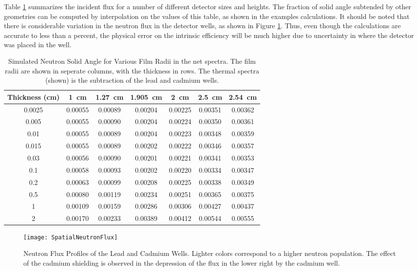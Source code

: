 Table \ref{tab:NeutronSolidAngle} summarizes the incident flux for a number of different detector sizes and heights.
The fraction of solid angle subtended by other geometries can be computed by interpolation on the values of this table, as shown in the examples calculations.
It should be noted that there is considerable variation in the neutron flux in the detector wells, as shown in Figure \ref{fig:NeutronFluxProfiles}.
Thus, even though the calculations are accurate to less than a percent, the physical error on the intrinsic efficiency will be much higher due to uncertainty in where the detector was placed in the well.

\begin{table}
	\centering
	\caption[Simulated Thermal Neutron Solid Angle for Various Film Radii]{Simulated Neutron Solid Angle for Various Film Radii in the net spectra. The film radii are shown in seperate columns, with the thickness in rows. The thermal spectra (shown) is the subtraction of the lead and cadmium wells.}
	\label{tab:NeutronSolidAngle}
	\begin{tabular}{c | c c c c c c}
Thickness (\si{\cm})	&	\SI{1}{\cm}	&	\SI{1.27}{\cm}	&	\SI{1.905}{\cm}	&	\SI{2}{\cm}	&	\SI{2.5}{\cm}	&	\SI{2.54}{\cm} \\ \hline
0.0025	&	0.00055	&	0.00089	&	0.00204	&	0.00225	&	0.00351	&	0.00362	\\
0.005	&	0.00055	&	0.00090	&	0.00204	&	0.00224	&	0.00350	&	0.00361	\\
0.01	&	0.00055	&	0.00089	&	0.00204	&	0.00223	&	0.00348	&	0.00359	\\
0.015	&	0.00055	&	0.00089	&	0.00202	&	0.00222	&	0.00346	&	0.00357	\\
0.03	&	0.00056	&	0.00090	&	0.00201	&	0.00221	&	0.00341	&	0.00353	\\
0.1	&	0.00058	&	0.00093	&	0.00202	&	0.00220	&	0.00334	&	0.00347	\\
0.2	&	0.00063	&	0.00099	&	0.00208	&	0.00225	&	0.00338	&	0.00349	\\
0.5	&	0.00080	&	0.00119	&	0.00234	&	0.00251	&	0.00365	&	0.00375	\\
1	&	0.00109	&	0.00159	&	0.00286	&	0.00306	&	0.00427	&	0.00437	\\
2	&	0.00170	&	0.00233	&	0.00389	&	0.00412	&	0.00544	&	0.00555	\\
	\end{tabular}
\end{table}
\begin{figure}
	\texttt{[image: SpatialNeutronFlux]}
  \caption[Neutron Flux Profiles of the Lead and Cadmium Wells]{Neutron Flux Profiles of the Lead and Cadmium Wells. Lighter colors correspond to a higher neutron population. The effect of the cadmium shielding is observed in the depression of the flux in the lower right by the cadmium well.}
  \label{fig:NeutronFluxProfiles}
\end{figure}

